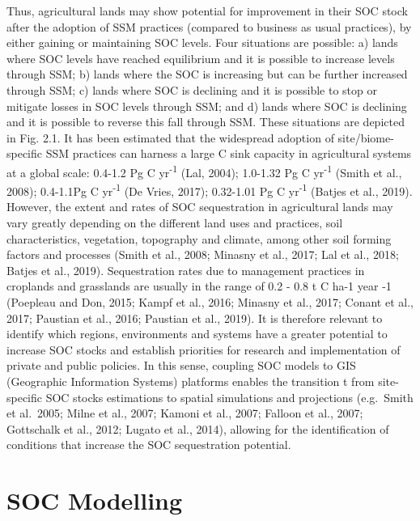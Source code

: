 \documentclass[
  10pt,
  b5paper,
]{book}
\begin{document}
Thus, agricultural lands may show potential for improvement in their SOC stock after the adoption of SSM practices (compared to business as usual practices), by either gaining or maintaining SOC levels. Four situations are possible: a) lands where SOC levels have reached equilibrium and it is possible to increase levels through SSM; b) lands where the SOC is increasing but can be further increased through SSM; c) lands where SOC is declining and it is possible to stop or mitigate losses in SOC levels through SSM; and d) lands where SOC is declining and it is possible to reverse this fall through SSM. These situations are depicted in Fig. 2.1.
It has been estimated that the widespread adoption of site/biome-specific SSM practices can harness a large C sink capacity in agricultural systems at a global scale: 0.4-1.2 Pg C yr\textsuperscript{-1} (Lal, 2004); 1.0-1.32 Pg C yr\textsuperscript{-1} (Smith et al., 2008); 0.4-1.1Pg C yr\textsuperscript{-1} (De Vries, 2017); 0.32-1.01 Pg C yr\textsuperscript{-1} (Batjes et al., 2019). However, the extent and rates of SOC sequestration in agricultural lands may vary greatly depending on the different land uses and practices, soil characteristics, vegetation, topography and climate, among other soil forming factors and processes (Smith et al., 2008; Minasny et al., 2017; Lal et al., 2018; Batjes et al., 2019). Sequestration rates due to management practices in croplands and grasslands are usually in the range of 0.2 - 0.8 t C ha-1 year -1 (Poepleau and Don, 2015; Kampf et al., 2016; Minasny et al., 2017; Conant et al., 2017; Paustian et al., 2016; Paustian et al., 2019).
It is therefore relevant to identify which regions, environments and systems have a greater potential to increase SOC stocks and establish priorities for research and implementation of private and public policies. In this sense, coupling SOC models to GIS (Geographic Information Systems) platforms enables the transition t from site-specific SOC stocks estimations to spatial simulations and projections (e.g.~Smith et al.~2005; Milne et al., 2007; Kamoni et al., 2007; Falloon et al., 2007; Gottschalk et al., 2012; Lugato et al., 2014), allowing for the identification of conditions that increase the SOC sequestration potential.

\hypertarget{soc-modelling}{%
\chapter{\textbar{} SOC Modelling}\label{soc-modelling}}
\end{document}

